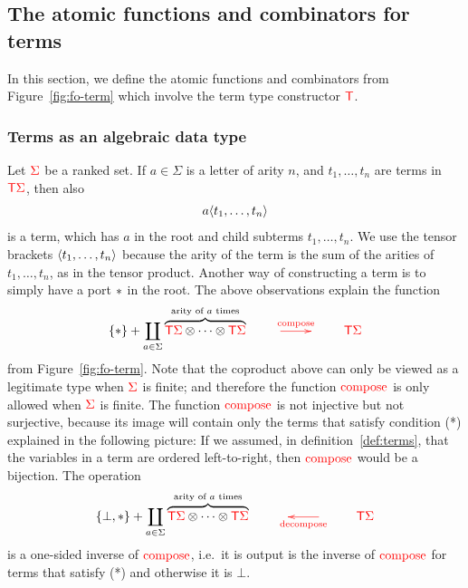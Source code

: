 





\subsection{The atomic functions and combinators for terms}
\label{sec:atomic-and-combinators}
In this section, we define the atomic functions and combinators from Figure~\ref{fig:fo-term} which involve the term type constructor ${\color{red}{\mathsf T}}$. 





\subsubsection{Terms as an algebraic data type} Let ${\color{red}{\Sigma}}$ be a ranked set. If $a \in \Sigma$ is a letter of arity $n$, and $t_1,\ldots,t_n$ are terms in ${\color{red}{\mathsf T}} {\color{red}{\Sigma}}$, then also 
\begin{align*}
    a \langle{t_1,\ldots,t_n}\rangle
\end{align*}
is a term, which has $a$ in the root and child subterms $t_1,\ldots,t_n$. We use the tensor brackets $\langle{t_1,\ldots,t_n}\rangle$ because the arity of the term is the sum of the arities of $t_1,\ldots,t_n$, as in the tensor product. Another way of constructing a term is to simply have a port $*$ in the root. The above observations explain the function 
\begin{align*}     
    \set * + \coprod_{a \in \Sigma} \overbrace{\tmonad \rSigma \otimes \cdots \otimes \tmonad \rSigma}^{\text{arity of $a$ times}}   \qquad \ranked{\xymatrix{
        \ar[r]^{\composeterm}& 
    }} \qquad \tmonad \rSigma
\end{align*}
from Figure~\ref{fig:fo-term}. Note that the coproduct above can only be viewed as a legitimate type when ${\color{red}{\Sigma}}$ is finite; and therefore the function ${\color{red}{\mathrm{compose}}}$ is only allowed when ${\color{red}{\Sigma}}$ is finite. The function ${\color{red}{\mathrm{compose}}}$ is not injective but not surjective, because its image will contain only the terms that satisfy condition (*) explained in the following picture: 
If we assumed, in definition~\ref{def:terms}, that the variables in a term are ordered left-to-right, then ${\color{red}{\mathrm{compose}}}$ would be a bijection. The operation 
\begin{align*}     
    \set {\bot,*} + \coprod_{a \in \Sigma} \overbrace{\tmonad \rSigma \otimes \cdots \otimes \tmonad \rSigma}^{\text{arity of $a$ times}}   \qquad \ranked{\xymatrix{
&          \ar[l]^{\decomposeterm} 
    }} \qquad \tmonad \rSigma
\end{align*}
is a one-sided inverse of ${\color{red}{\mathrm{compose}}}$, i.e.~it is output is the inverse of ${\color{red}{\mathrm{compose}}}$ for terms that satisfy (*) and otherwise it is $\bot$. 


